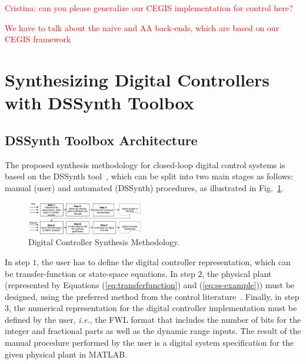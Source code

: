 \documentclass[10pt,conference]{IEEEtran}
\newcommand\tool{{DSSynth Toolbox}\xspace}
\begin{document}
\textcolor{red}{Cristina: can you please generalize our CEGIS implementation for control here?}

\textcolor{red}{We have to talk about the naive and AA back-ends, which are based on our CEGIS framework}

\section{Synthesizing Digital Controllers with \tool}

\subsection{\tool Architecture}

The proposed synthesis methodology for closed-loop digital control
systems is based on the DSSynth tool~\cite{abate2017, abatecav2017}, 
which can be split into two main stages as follows: manual (user) and 
automated (DSSynth) procedures, as illustrated in Fig.~\ref{fig:synthesis-flow}. 
%
\begin{figure}[ht!]
\centering
\includegraphics[width=0.45\textwidth]{synthesis-flow.pdf}
\caption{Digital Controller Synthesis Methodology.}
\label{fig:synthesis-flow}
\end{figure}

In step $1$, the user has to define the digital controller representation, 
which can be transfer-function or state-space equations. 
In step $2$, the physical plant (represented by Equations (\ref{eq:transferfunction}) 
and (\ref{eq:ss-example})) must be designed, using the preferred method 
from the control literature~\cite{astrom1997computer}. Finally, in step $3$, 
the numerical representation for the digital controller implementation must be 
defined by the user, {\it i.e.}, the FWL format that includes the number of bits for the integer 
and fractional parts as well as the dynamic range inputs. The result of the manual 
procedure performed by the user is a digital system specification for the given 
physical plant in MATLAB. 
\end{document}

